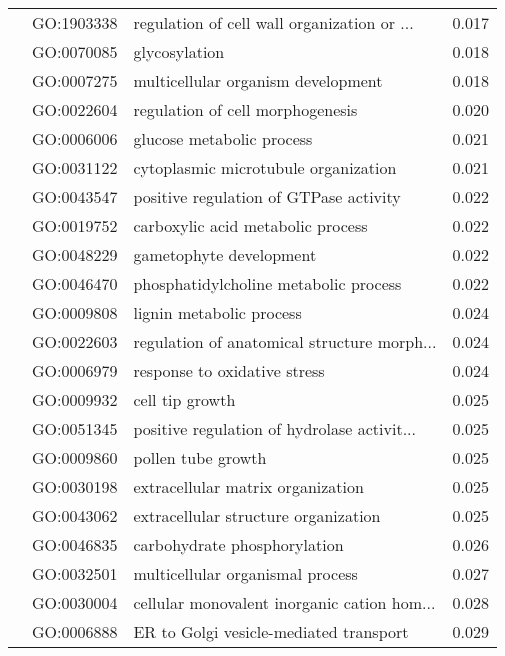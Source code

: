 \begin{longtable}{lllr}
   & GO:1903338 &  regulation of cell wall organization or ... &         0.017 \\
   & GO:0070085 &                                glycosylation &         0.018 \\
   & GO:0007275 &           multicellular organism development &         0.018 \\
   & GO:0022604 &             regulation of cell morphogenesis &         0.020 \\
   & GO:0006006 &                    glucose metabolic process &         0.021 \\
   & GO:0031122 &         cytoplasmic microtubule organization &         0.021 \\
   & GO:0043547 &       positive regulation of GTPase activity &         0.022 \\
   & GO:0019752 &            carboxylic acid metabolic process &         0.022 \\
   & GO:0048229 &                      gametophyte development &         0.022 \\
   & GO:0046470 &        phosphatidylcholine metabolic process &         0.022 \\
   & GO:0009808 &                     lignin metabolic process &         0.024 \\
   & GO:0022603 &  regulation of anatomical structure morph... &         0.024 \\
   & GO:0006979 &                 response to oxidative stress &         0.024 \\
   & GO:0009932 &                              cell tip growth &         0.025 \\
   & GO:0051345 &  positive regulation of hydrolase activit... &         0.025 \\
   & GO:0009860 &                           pollen tube growth &         0.025 \\
   & GO:0030198 &            extracellular matrix organization &         0.025 \\
   & GO:0043062 &         extracellular structure organization &         0.025 \\
   & GO:0046835 &                 carbohydrate phosphorylation &         0.026 \\
   & GO:0032501 &             multicellular organismal process &         0.027 \\
   & GO:0030004 &  cellular monovalent inorganic cation hom... &         0.028 \\
   & GO:0006888 &       ER to Golgi vesicle-mediated transport &         0.029 \\

\end{longtable}
